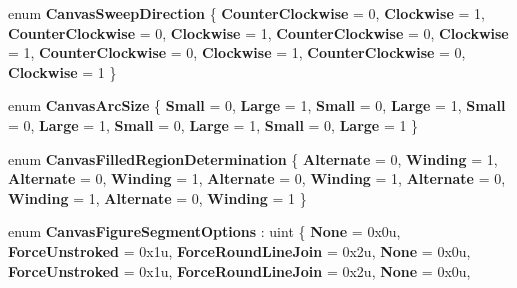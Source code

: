 \begin{DoxyCompactItemize}
enum {\bfseries Canvas\+Sweep\+Direction} \{ \newline
{\bfseries Counter\+Clockwise} = 0, 
{\bfseries Clockwise} = 1, 
{\bfseries Counter\+Clockwise} = 0, 
{\bfseries Clockwise} = 1, 
\newline
{\bfseries Counter\+Clockwise} = 0, 
{\bfseries Clockwise} = 1, 
{\bfseries Counter\+Clockwise} = 0, 
{\bfseries Clockwise} = 1, 
\newline
{\bfseries Counter\+Clockwise} = 0, 
{\bfseries Clockwise} = 1
 \}
\item 
\mbox{\label{namespace_microsoft_1_1_graphics_1_1_canvas_1_1_geometry_a583cc3265f037d53e69808d04a785d9a}} 
enum {\bfseries Canvas\+Arc\+Size} \{ \newline
{\bfseries Small} = 0, 
{\bfseries Large} = 1, 
{\bfseries Small} = 0, 
{\bfseries Large} = 1, 
\newline
{\bfseries Small} = 0, 
{\bfseries Large} = 1, 
{\bfseries Small} = 0, 
{\bfseries Large} = 1, 
\newline
{\bfseries Small} = 0, 
{\bfseries Large} = 1
 \}
\item 
\mbox{\label{namespace_microsoft_1_1_graphics_1_1_canvas_1_1_geometry_af9fb7e1db5b8bf2c9334f51491270043}} 
enum {\bfseries Canvas\+Filled\+Region\+Determination} \{ \newline
{\bfseries Alternate} = 0, 
{\bfseries Winding} = 1, 
{\bfseries Alternate} = 0, 
{\bfseries Winding} = 1, 
\newline
{\bfseries Alternate} = 0, 
{\bfseries Winding} = 1, 
{\bfseries Alternate} = 0, 
{\bfseries Winding} = 1, 
\newline
{\bfseries Alternate} = 0, 
{\bfseries Winding} = 1
 \}
\item 
\mbox{\label{namespace_microsoft_1_1_graphics_1_1_canvas_1_1_geometry_ada89e04bb167c7a96061368c1d6cc2ab}} 
enum {\bfseries Canvas\+Figure\+Segment\+Options} \+: uint \{ \newline
{\bfseries None} = 0x0u, 
{\bfseries Force\+Unstroked} = 0x1u, 
{\bfseries Force\+Round\+Line\+Join} = 0x2u, 
{\bfseries None} = 0x0u, 
\newline
{\bfseries Force\+Unstroked} = 0x1u, 
{\bfseries Force\+Round\+Line\+Join} = 0x2u, 
{\bfseries None} = 0x0u, 

\end{DoxyCompactItemize}
